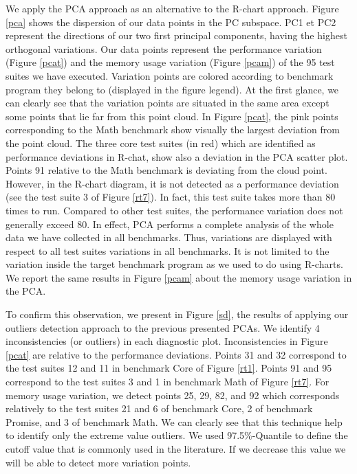 We apply the PCA approach as an alternative to the R-chart approach. Figure \ref{pca} shows the dispersion of our data points in the PC subspace. PC1 et PC2 represent the directions of our two first principal components, having the highest orthogonal variations. Our data points represent the performance variation (Figure \ref{pcat}) and the memory usage variation (Figure \ref{pcam}) of the 95 test suites we have executed. Variation points are colored according to benchmark program they belong to (displayed in the figure legend). At the first glance, we can clearly see that the variation points are situated in the same area except some points that lie far from this point cloud. In Figure \ref{pcat}, the pink points corresponding to the Math benchmark show visually the largest deviation from the point cloud. The three core test suites (in red) which are identified as performance deviations in R-chat, show also a deviation in the PCA scatter plot. Points 91 relative to the Math benchmark is deviating from the cloud point. However, in the R-chart diagram, it is not detected as a performance deviation (see the test suite 3 of Figure \ref{rt7}). In fact, this test suite takes more than 80 times to run. Compared to other test suites, the performance variation does not generally exceed 80. In effect, PCA performs a complete analysis of the whole data we have collected in all benchmarks. Thus, variations are displayed with respect to all test suites variations in all benchmarks. It is not limited to the variation inside the target benchmark program as we used to do using R-charts. We report the same results in Figure \ref{pcam} about the memory usage variation in the PCA. 


To confirm this observation, we present in Figure \ref{sd}, the results of applying our outliers detection approach to the previous presented PCAs. We identify 4 inconsistencies (or outliers) in each diagnostic plot. Inconsistencies in Figure \ref{pcat} are relative to the performance deviations. Points 31 and 32 correspond to the test suites 12 and 11 in benchmark Core of Figure \ref{rt1}. Points 91 and 95 correspond to the test suites 3 and 1 in benchmark Math of Figure \ref{rt7}. For memory usage variation, we detect points 25, 29, 82, and 92 which corresponds relatively to the test suites 21 and 6 of benchmark Core, 2 of benchmark Promise, and 3 of benchmark Math.
We can clearly see that this technique help to identify only the extreme value outliers. We used 97.5\%-Quantile to define the cutoff value that is commonly used in the literature\cite{enot2008preprocessing,hubert2009robust}. If we decrease this value we will be able to detect more variation points. 


